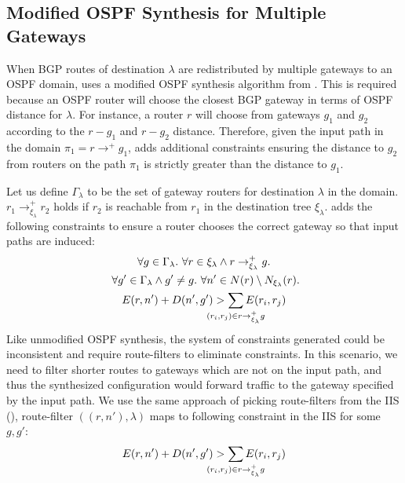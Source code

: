 \subsection{Modified OSPF Synthesis for Multiple Gateways}
When BGP routes of destination $\lambda$ 
are redistributed by multiple gateways to an 
OSPF domain, \name uses a modified OSPF synthesis
algorithm from . This is 
required because an OSPF router will choose
the closest BGP gateway in terms of OSPF distance 
for $\lambda$. For instance, a router $r$ will choose
from gateways $g_1$ and $g_2$ according to the $r-g_1$
and $r-g_2$ distance. Therefore, given the input path in
the domain $\pi_1=r \rightarrow^+ g_1$, \name adds additional
constraints ensuring the distance to $g_2$ from routers
on the path $\pi_1$ is strictly
greater than the distance to $g_1$. 

Let us define $\Gamma_\lambda$ to be the set of gateway
routers for destination $\lambda$ in the domain. 
$r_1 \rightarrow^+_{\xi_{\lambda}} r_2$ holds if
$r_2$ is reachable from $r_1$ in the destination tree $\xi_\lambda$.
\name adds the following constraints 
to ensure a router
chooses the correct gateway so that input 
paths are induced: 
\begin{multline} \label{eq:gateway}
\forall g \in \Gamma_{\lambda}.~\forall r \in \xi_\lambda 
\wedge r \rightarrow^+_{\xi_{\lambda}} g. \\
~\forall g' \in \Gamma_{\lambda} \wedge g' \not= g. 
~\forall n' \in N(r) \setminus N_{\xi_\lambda}(r). \\
E(r, n') + D(n', g') > \sum_{\mathclap{\substack{(r_i,r_j) \in r \rightarrow^+_{\xi_{\lambda}} g }}} 
E(r_i, r_j) 
\end{multline}
Like unmodified OSPF synthesis, the system of
constraints generated could be inconsistent and require
route-filters to eliminate constraints. In this scenario,
we need to filter shorter routes to gateways which are
not on the input path, and 
thus the synthesized configuration would forward traffic to
the gateway specified by the input path. 
We use the same 
approach of picking route-filters from the IIS
(), route-filter $((r, n'), \lambda)$
maps to following constraint in the IIS for some $g,g'$: 
\begin{equation}
E(r, n') + D(n', g') > \sum_{\mathclap{\substack{(r_i,r_j) \in r \rightarrow^+_{\xi_{\lambda}} g }}} 
E(r_i, r_j) 
\end{equation}